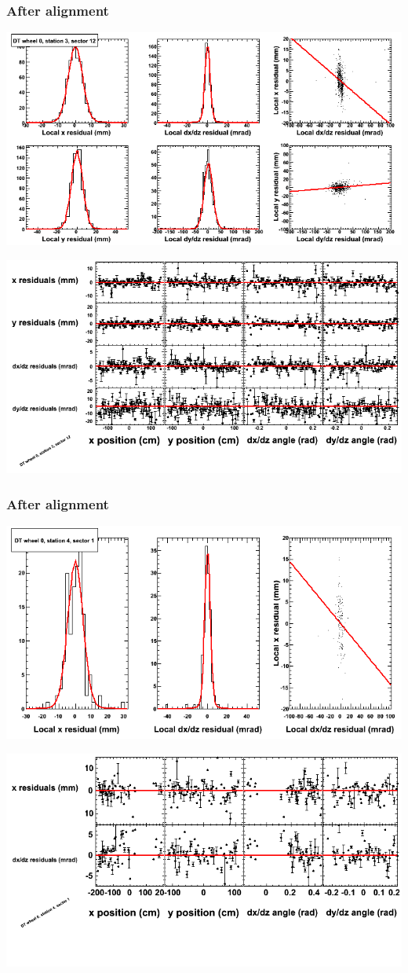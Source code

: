 \documentclass[compress]{beamer}
\begin{document}
\begin{frame}
\frametitle{After alignment}
\includegraphics[width=0.7\linewidth]{NOV4_fitfunctions/MBwhCst3sec12_bellcurves.png}

\includegraphics[width=0.7\linewidth]{NOV4_fitfunctions/MBwhCst3sec12_polynomials.png}
\end{frame}

\begin{frame}
\frametitle{After alignment}
\includegraphics[width=0.7\linewidth]{NOV4_fitfunctions/MBwhCst4sec01_bellcurves.png}

\includegraphics[width=0.7\linewidth]{NOV4_fitfunctions/MBwhCst4sec01_polynomials.png}
\end{frame}
\end{document}
